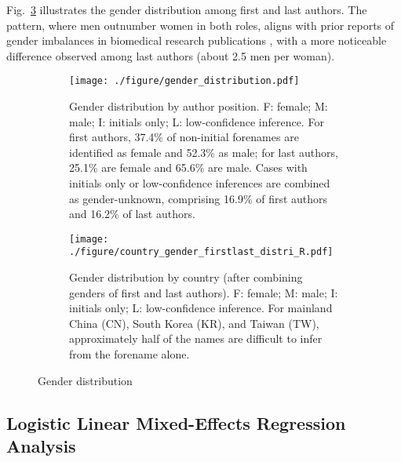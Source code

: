 \begin{appendices}
Fig.~\ref{fig__gender_distribution} illustrates the gender distribution among
first and last authors. The pattern, where men outnumber women in both
roles, aligns with prior reports of gender imbalances in biomedical research
publications \citep{ioannidis2023gender}, 
with a more noticeable difference observed among last authors (about 2.5 men per woman).


\begin{figure}[!ht]
    \centering
    \begin{subfigure}{\textwidth}
        \centering
        \texttt{[image: ./figure/gender\_distribution.pdf]}
    \caption{Gender distribution by author position. F: female; M: male; I:
    initials only; L: low-confidence inference. For first authors, 37.4\% of
    non-initial forenames are identified as female and 52.3\% as male; for last
    authors, 25.1\% are female and 65.6\% are male. Cases with initials only or
    low-confidence inferences are combined as gender-unknown, comprising 16.9\%
    of first authors and 16.2\% of last authors.}
        \label{fig__gender_distribution_1}
    \end{subfigure}
    \hfill
    \begin{subfigure}{\textwidth}
        \centering
        \texttt{[image: ./figure/country\_gender\_firstlast\_distri\_R.pdf]}  %
	\caption{
      Gender distribution by country (after combining genders of first and last
      authors). F: female; M: male; I: initials only; L: low-confidence
      inference. For mainland China (CN), South Korea (KR), and Taiwan (TW),
      approximately half of the names are difficult to infer from the forename
      alone.
      }
        \label{fig__gender_distribution_2}
    \end{subfigure}

    \caption{Gender distribution}
    \label{fig__gender_distribution}
\end{figure}


\newpage

\subsection{Logistic Linear Mixed-Effects Regression Analysis}




\end{appendices}
